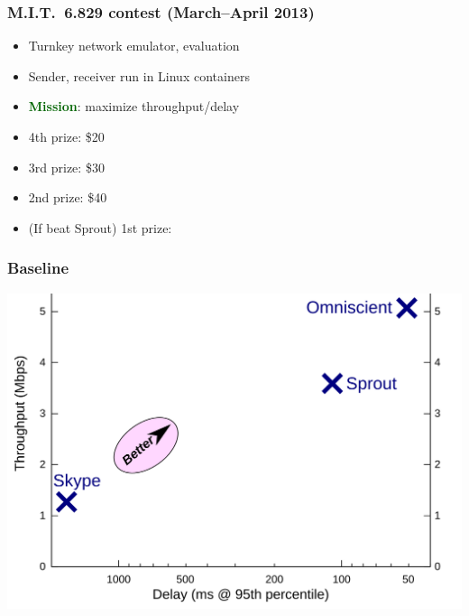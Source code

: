 \documentclass[svgnames]{beamer}
\begin{document}
\begin{frame}
\frametitle{M.I.T.~6.829 contest (March--April 2013)}

\begin{itemize}
\item Turnkey network emulator, evaluation

\item Sender, receiver run in Linux containers

\item \textbf{\textcolor{DarkGreen}{Mission}}: maximize throughput/delay

\item 4th prize: \$20

\item 3rd prize: \$30

\item 2nd prize: \$40

\item (If beat Sprout) 1st prize: \pause {\color{DarkBlue}{\bf Co-authorship on future paper}}

\end{itemize}

\vspace{\baselineskip}
\vspace{\baselineskip}
\vspace{\baselineskip}


\end{frame}

\begin{frame}
\frametitle{Baseline}

\begin{centering}
\includegraphics[width=0.9\columnwidth]{pointplot-nostudents.png}

\end{centering}

\end{frame}
\end{document}
